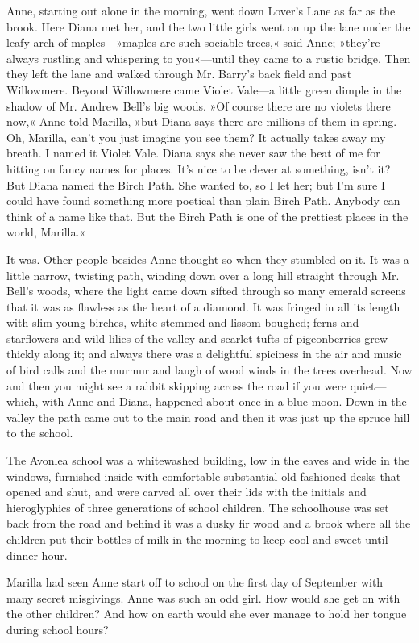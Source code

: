 Anne, starting out alone in the morning, went down Lover's Lane as far as the brook. Here Diana met her, and the two little girls went on up the lane under the leafy arch of maples—»maples are such sociable trees,« said Anne; »they're always rustling and whispering to you«—until they came to a rustic bridge. Then they left the lane and walked through Mr. Barry's back field and past Willowmere. Beyond Willowmere came Violet Vale—a little green dimple in the shadow of Mr. Andrew Bell's big woods. »Of course there are no violets there now,« Anne told Marilla, »but Diana says there are millions of them in spring. Oh, Marilla, can't you just imagine you see them? It actually takes away my breath. I named it Violet Vale. Diana says she never saw the beat of me for hitting on fancy names for places. It's nice to be clever at something, isn't it? But Diana named the Birch Path. She wanted to, so I let her; but I'm sure I could have found something more poetical than plain Birch Path. Anybody can think of a name like that. But the Birch Path is one of the prettiest places in the world, Marilla.«

It was. Other people besides Anne thought so when they stumbled on it. It was a little narrow, twisting path, winding down over a long hill straight through Mr. Bell's woods, where the light came down sifted through so many emerald screens that it was as flawless as the heart of a diamond. It was fringed in all its length with slim young birches, white stemmed and lissom boughed; ferns and starflowers and wild lilies-of-the-valley and scarlet tufts of pigeonberries grew thickly along it; and always there was a delightful spiciness in the air and music of bird calls and the murmur and laugh of wood winds in the trees overhead. Now and then you might see a rabbit skipping across the road if you were quiet—which, with Anne and Diana, happened about once in a blue moon. Down in the valley the path came out to the main road and then it was just up the spruce hill to the school.

The Avonlea school was a whitewashed building, low in the eaves and wide in the windows, furnished inside with comfortable substantial old-fashioned desks that opened and shut, and were carved all over their lids with the initials and hieroglyphics of three generations of school children. The schoolhouse was set back from the road and behind it was a dusky fir wood and a brook where all the children put their bottles of milk in the morning to keep cool and sweet until dinner hour.

Marilla had seen Anne start off to school on the first day of September with many secret misgivings. Anne was such an odd girl. How would she get on with the other children? And how on earth would she ever manage to hold her tongue during school hours?

